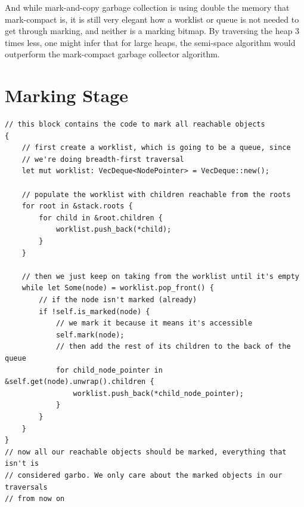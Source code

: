 \documentclass[index]{subfiles}
\begin{document}
And while mark-and-copy garbage collection is using double the memory that mark-compact is, it is still very elegant how a worklist or queue is not needed to  get through marking, and neither is a marking bitmap. By traversing the heap 3 times less, one might infer that for large heaps, the semi-space algorithm would outperform the mark-compact garbage collector algorithm.


\appendix
\section{Marking Stage}
\begin{verbatim}
// this block contains the code to mark all reachable objects
{
    // first create a worklist, which is going to be a queue, since
    // we're doing breadth-first traversal
    let mut worklist: VecDeque<NodePointer> = VecDeque::new();

    // populate the worklist with children reachable from the roots
    for root in &stack.roots {
        for child in &root.children {
            worklist.push_back(*child);
        }
    }

    // then we just keep on taking from the worklist until it's empty
    while let Some(node) = worklist.pop_front() {
        // if the node isn't marked (already)
        if !self.is_marked(node) {
            // we mark it because it means it's accessible
            self.mark(node);
            // then add the rest of its children to the back of the queue
            for child_node_pointer in &self.get(node).unwrap().children {
                worklist.push_back(*child_node_pointer);
            }
        }
    }
}
// now all our reachable objects should be marked, everything that isn't is
// considered garbo. We only care about the marked objects in our traversals
// from now on
\end{verbatim}
\end{document}
